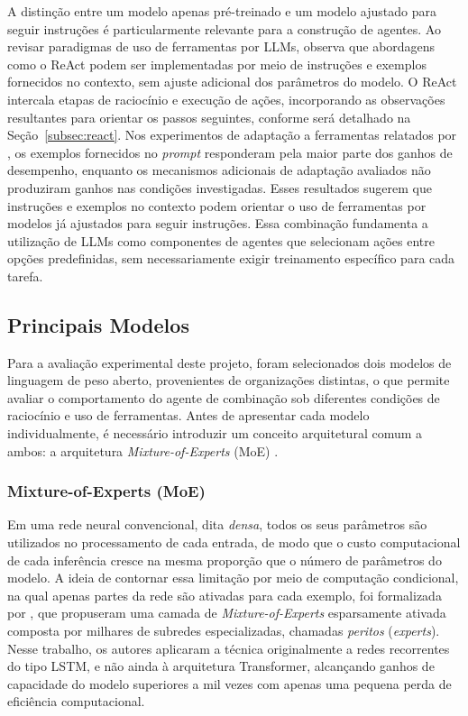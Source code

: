 A distinção entre um modelo apenas pré-treinado e um modelo ajustado para seguir instruções é particularmente relevante para a construção de agentes. Ao revisar paradigmas de uso de ferramentas por LLMs, \citet{kumar2026metatool} observa que abordagens como o ReAct \citep{yao2023react} podem ser implementadas por meio de instruções e exemplos fornecidos no contexto, sem ajuste adicional dos parâmetros do modelo. O ReAct intercala etapas de raciocínio e execução de ações, incorporando as observações resultantes para orientar os passos seguintes, conforme será detalhado na Seção~\ref{subsec:react}. Nos experimentos de adaptação a ferramentas relatados por \citet{kumar2026metatool}, os exemplos fornecidos no \textit{prompt} responderam pela maior parte dos ganhos de desempenho, enquanto os mecanismos adicionais de adaptação avaliados não produziram ganhos nas condições investigadas. Esses resultados sugerem que instruções e exemplos no contexto podem orientar o uso de ferramentas por modelos já ajustados para seguir instruções. Essa combinação fundamenta a utilização de LLMs como componentes de agentes que selecionam ações entre opções predefinidas, sem necessariamente exigir treinamento específico para cada tarefa.



\subsection{Principais Modelos}
\label{subsec:principais-modelos}

Para a avaliação experimental deste projeto, foram selecionados dois modelos de linguagem de peso aberto, provenientes de organizações distintas, o que permite avaliar o comportamento do agente de combinação sob diferentes condições de raciocínio e uso de ferramentas. Antes de apresentar cada modelo individualmente, é necessário introduzir um conceito arquitetural comum a ambos: a arquitetura \textit{Mixture-of-Experts} (MoE) \citep{masoudnia2014mixture}. 

\subsubsection{Mixture-of-Experts (MoE)}

Em uma rede neural convencional, dita \textit{densa}, todos os seus parâmetros são utilizados no processamento de cada entrada, de modo que o custo computacional de cada inferência cresce na mesma proporção que o número de parâmetros do modelo. A ideia de contornar essa limitação por meio de computação condicional, na qual apenas partes da rede são ativadas para cada exemplo, foi formalizada por \citet{shazeer2017moe}, que propuseram uma camada de \textit{Mixture-of-Experts} esparsamente ativada composta por milhares de subredes especializadas, chamadas \textit{peritos} (\textit{experts}). Nesse trabalho, os autores aplicaram a técnica originalmente a redes recorrentes do tipo LSTM, e não ainda à arquitetura Transformer, alcançando ganhos de capacidade do modelo superiores a mil vezes com apenas uma pequena perda de eficiência computacional.

